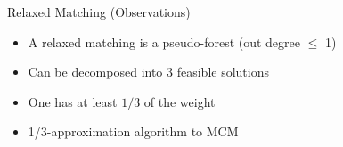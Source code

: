 \begin{frame}{Relaxed Matching (Observations)}
\begin{itemize}
  \item<1> A relaxed matching is a pseudo-forest (out degree $\leq$ 1)
  \item<2> Can be decomposed into 3 feasible solutions
  \item<3> One has at least $1/3$ of the weight 
  \item<8> 1/3-approximation algorithm to MCM
\end{itemize}
\centering

\end{frame}